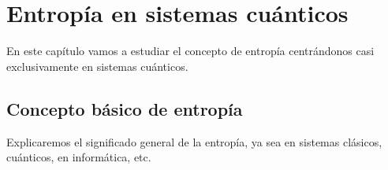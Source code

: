 %

\chapter{Entropía en sistemas cuánticos}
En este capítulo vamos a estudiar el concepto de entropía centrándonos casi
exclusivamente en sistemas cuánticos.

\section{Concepto básico de entropía}
Explicaremos el significado general de la entropía, ya sea en sistemas
clásicos, cuánticos, en informática, etc.

